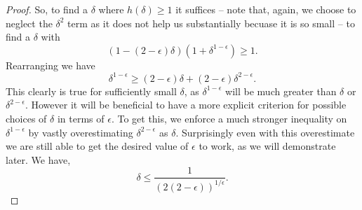 \documentclass[twocolumn]{article}[10pt]
\begin{document}
\begin{proof}
  So, to find a $\delta$ where $h(\delta) \ge 1$ it suffices -- note that, again, we choose
  to neglect the $\delta^2$ term as it does not help us substantially becuase
  it is so small -- to find a $\delta$ with 
  $$(1-(2-\epsilon)\delta)(1+\delta^{1-\epsilon}) \ge 1.$$
  Rearranging we have 
  $$\delta^{1-\epsilon} \ge (2-\epsilon)\delta + (2-\epsilon)\delta^{2-\epsilon}.$$
  This clearly is true for sufficiently small $\delta$, as
  $\delta^{1-\epsilon}$ will be much greater than $\delta$ or
  $\delta^{2-\epsilon}$.
  However it will be beneficial to have a more explicit criterion for possible
  choices of $\delta$ in terms of $\epsilon$. To get this, we enforce a much
  stronger inequality on $\delta^{1-\epsilon}$ by vastly overestimating
  $\delta^{2-\epsilon}$ as $\delta$. Surprisingly even with this overestimate
  we are still able to get the desired value of $\epsilon$ to work, as we will demonstrate later.
  We have,
  \begin{equation}
    \label{eqn:deltaUpperIneq}
    \delta \le \frac{1}{(2(2-\epsilon))^{1/\epsilon}}. 
  \end{equation}


\end{proof}
\end{document}
